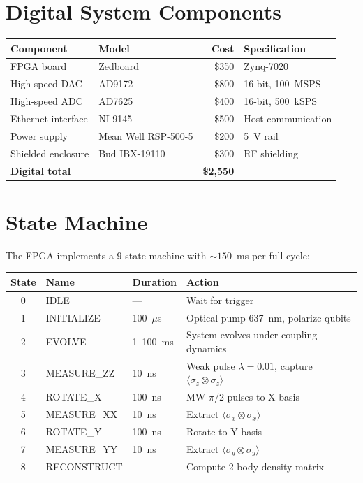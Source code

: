 \documentclass[11pt,a4paper,openany]{book}
\begin{document}
\section{Digital System Components}

\begin{center}
\begin{tabular}{llrl}
\toprule
\textbf{Component} & \textbf{Model} & \textbf{Cost} & \textbf{Specification} \\
\midrule
FPGA board & Zedboard & \$350 & Zynq-7020 \\
High-speed DAC & AD9172 & \$800 & 16-bit, 100~MSPS \\
High-speed ADC & AD7625 & \$400 & 16-bit, 500~kSPS \\
Ethernet interface & NI-9145 & \$500 & Host communication \\
Power supply & Mean Well RSP-500-5 & \$200 & 5~V rail \\
Shielded enclosure & Bud IBX-19110 & \$300 & RF shielding \\
\midrule
\multicolumn{2}{l}{\textbf{Digital total}} & \textbf{\$2,550} & \\
\bottomrule
\end{tabular}
\end{center}

\section{State Machine}

The FPGA implements a 9-state machine with ${\sim}150$~ms per full cycle:

\begin{center}
\small
\begin{tabular}{clll}
\toprule
\textbf{State} & \textbf{Name} & \textbf{Duration} & \textbf{Action} \\
\midrule
0 & IDLE & --- & Wait for trigger \\
1 & INITIALIZE & 100~$\mu$s & Optical pump 637~nm, polarize qubits \\
2 & EVOLVE & 1--100~ms & System evolves under coupling dynamics \\
3 & MEASURE\_ZZ & 10~ns & Weak pulse $\lambda = 0.01$, capture $\langle\sigma_z \otimes \sigma_z\rangle$ \\
4 & ROTATE\_X & 100~ns & MW $\pi/2$ pulses to X basis \\
5 & MEASURE\_XX & 10~ns & Extract $\langle\sigma_x \otimes \sigma_x\rangle$ \\
6 & ROTATE\_Y & 100~ns & Rotate to Y basis \\
7 & MEASURE\_YY & 10~ns & Extract $\langle\sigma_y \otimes \sigma_y\rangle$ \\
8 & RECONSTRUCT & --- & Compute 2-body density matrix \\
\bottomrule
\end{tabular}
\end{center}
\end{document}
